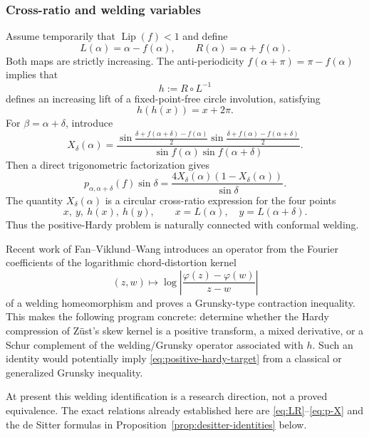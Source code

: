\documentclass[11pt]{article}
\begin{document}
\subsubsection{Cross-ratio and welding variables}

Assume temporarily that $\operatorname{Lip}(f)<1$ and define
\begin{equation}\label{eq:LR}
        L(\alpha)=\alpha-f(\alpha),
        \qquad
        R(\alpha)=\alpha+f(\alpha).
\end{equation}
Both maps are strictly increasing.  The anti-periodicity
$f(\alpha+\pi)=\pi-f(\alpha)$ implies that
\[
        h:=R\circ L^{-1}
\]
defines an increasing lift of a fixed-point-free circle involution,
satisfying
\begin{equation}\label{eq:h-involution}
        h(h(x))=x+2\pi.
\end{equation}
For $\beta=\alpha+\delta$, introduce
\begin{equation}\label{eq:X-crossratio}
 X_\delta(\alpha)
 =
 \frac{
 \sin\frac{\delta+f(\alpha+\delta)-f(\alpha)}{2}
 \sin\frac{\delta+f(\alpha)-f(\alpha+\delta)}{2}
 }{
 \sin f(\alpha)\sin f(\alpha+\delta)
 }.
\end{equation}
Then a direct trigonometric factorization gives
\begin{equation}\label{eq:p-X}
 \boxed{
 p_{\alpha,\alpha+\delta}(f)\sin\delta
 =
 \frac{4X_\delta(\alpha)
       (1-X_\delta(\alpha))}
      {\sin\delta}.}
\end{equation}
The quantity $X_\delta(\alpha)$ is a circular cross-ratio expression for
the four points
\[
        x,\ y,\ h(x),\ h(y),
        \qquad
        x=L(\alpha),\quad y=L(\alpha+\delta).
\]
Thus the positive-Hardy problem is naturally connected with conformal
welding.

Recent work of Fan--Viklund--Wang introduces an operator from the Fourier
coefficients of the logarithmic chord-distortion kernel
\[
        (z,w)\longmapsto
        \log\left|
        \frac{\varphi(z)-\varphi(w)}{z-w}
        \right|
\]
of a welding homeomorphism and proves a Grunsky-type contraction
inequality.  This makes the following program concrete: determine whether
the Hardy compression of Z\"ust's skew kernel is a positive transform, a
mixed derivative, or a Schur complement of the welding/Grunsky operator
associated with $h$.  Such an identity would potentially imply
\eqref{eq:positive-hardy-target} from a classical or generalized Grunsky
inequality.

At present this welding identification is a research direction, not a
proved equivalence.  The exact relations already established here are
\eqref{eq:LR}--\eqref{eq:p-X} and the de Sitter formulas in
Proposition~\ref{prop:desitter-identities} below.
\end{document}
